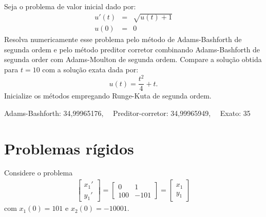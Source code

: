  \begin{exer} Seja o problema de valor inicial dado por:
\begin{eqnarray*}
  u'(t)  &=& \sqrt{u(t)+1} \\
  u(0) &=& 0
\end{eqnarray*} Resolva numericamente esse problema pelo método de Adams-Bashforth de segunda ordem e pelo método preditor corretor combinando Adams-Bashforth de segunda order com Adams-Moulton de segunda ordem. Compare a solução obtida para $t=10$ com a solução exata dada por:
$$u(t)=\frac{t^2}{4}+t.$$
 Inicialize os métodos empregando Runge-Kuta de segunda ordem. 
\end{exer}
\begin{resp}
 Adams-Bashforth: 34,99965176,~~ Preditor-corretor: 34,99965949,~~  Exato: 35

\end{resp}





\section{Problemas rígidos}\label{pvi:stiff}


Considere o problema
\begin{eqnarray*}
 \left[\begin{array}{c}x_1'\\y_1'\end{array}\right]=\left[\begin{array}{cc}0 & 1\\100 & -101\end{array}\right]=\left[\begin{array}{c}x_1\\y_1\end{array}\right]
\end{eqnarray*}
com $x_1(0)=101$ e $x_2(0)=-10001$.

